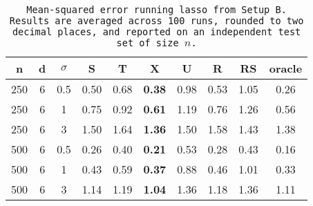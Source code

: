 \begin{table}[ht]
\centering
\begin{tabular}{cccccccccc}
  \hline
n & d & $\sigma$ & S & T & X & U & R & RS & oracle \\ 
  \hline
250 & 6 & 0.5 & 0.50 & 0.68 & \bf 0.38 & 0.98 & 0.53 & 1.05 & 0.26 \\ 
  250 & 6 & 1 & 0.75 & 0.92 & \bf 0.61 & 1.19 & 0.76 & 1.26 & 0.56 \\ 
  250 & 6 & 3 & 1.50 & 1.64 & \bf 1.36 & 1.50 & 1.58 & 1.43 & 1.38 \\ 
  500 & 6 & 0.5 & 0.26 & 0.40 & \bf 0.21 & 0.53 & 0.28 & 0.43 & 0.16 \\ 
  500 & 6 & 1 & 0.43 & 0.59 & \bf 0.37 & 0.88 & 0.46 & 1.01 & 0.33 \\ 
  500 & 6 & 3 & 1.14 & 1.19 & \bf 1.04 & 1.36 & 1.18 & 1.36 & 1.11 \\ 
   \hline
\end{tabular}
\caption{\tt Mean-squared error running \texttt{lasso} from Setup B. Results are averaged across 100 runs, rounded to two decimal places, and reported on an independent test set of size $n$.} 
\label{table:setup2}
\end{table}
